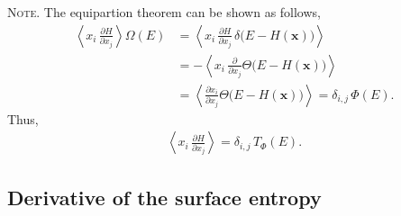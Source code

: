 \documentclass[preprint]{revtex4-1}
\newcommand{\note}[1]{{\color{DarkGreen}\footnotesize \textsc{Note.} #1}}
\begin{document}
\note{
  The equipartion theorem can be shown as follows,
  \begin{align*}
    \left\langle
      x_i \,
      \frac{ \partial H } { \partial x_j }
    \right\rangle
    \Omega(E)
    &=
    \left\langle
      x_i \,
      \frac{ \partial H } { \partial x_j }
      \,
      \delta\bigl(
        E - H(\mathbf x)
      \bigr)
    \right\rangle \\
    &=
    -
    \left\langle
      x_i \,
      \frac{ \partial } { \partial x_j }
      \Theta\bigl(
        E - H(\mathbf x)
      \bigr)
    \right\rangle
    \\
    &=
    \left\langle
      \frac{ \partial x_i } { \partial x_j }
      \Theta\bigl(
        E - H(\mathbf x)
      \bigr)
    \right\rangle
    =
    \delta_{i, j} \, \Phi(E)
    .
  \end{align*}
  Thus,
  \begin{align*}
    \left\langle
      x_i \,
      \frac{ \partial H } { \partial x_j }
    \right\rangle
    =
    \delta_{i, j} \, T_\Phi(E)
    .
  \end{align*}
}




\subsection{Derivative of the surface entropy}
\end{document}
